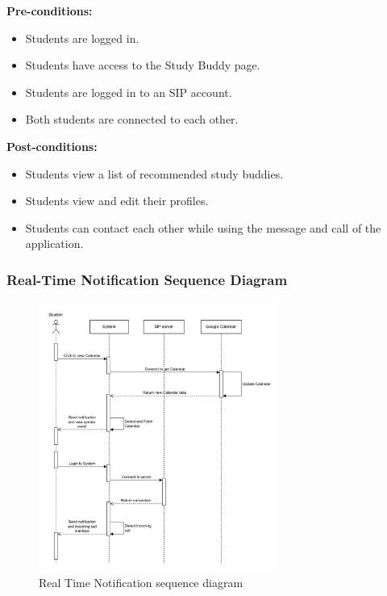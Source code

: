    \noindent \textbf{Pre-conditions:} 
        \begin{itemize}
            \item Students are logged in.
            \item Students have access to the Study Buddy page.
            \item Students are logged in to an SIP account.
            \item Both students are connected to each other.
        \end{itemize}
    \noindent \textbf{Post-conditions:}
    \begin{itemize}
        \item Students view a list of recommended study buddies.
        \item Students view and edit their profiles.
        \item Students can contact each other while using the message and call of the application.
    \end{itemize}

\subsubsection{Real-Time Notification Sequence Diagram}
    \begin{figure}[H]
        \centering
        \includegraphics[width=0.7\textwidth]{image/Real-timeNotification.pdf} 
        \caption{Real Time Notification sequence diagram}
        \label{fig:noti_sequence}
    \end{figure}

